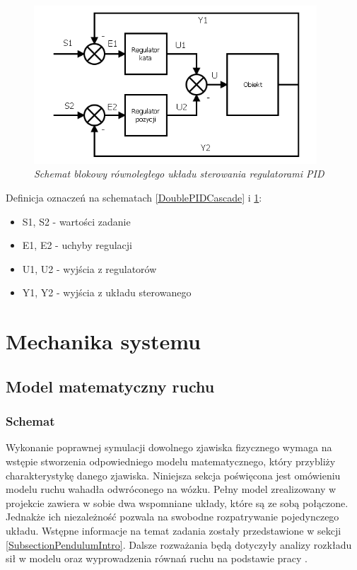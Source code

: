 \documentclass[12pt, oneside]{report}
\theoremstyle{definition}
\begin{document}
\begin{itemize}
\begin{figure}[H]
	\centering
		\includegraphics[width = 300pt]{DoublePIDParallel} 
		\caption{\textit{Schemat blokowy równoległego układu sterowania regulatorami PID\cite{JTJT}}}
		\label{DoublePIDParallel}
\end{figure}
\end{itemize}

Definicja oznaczeń na schematach \ref{DoublePIDCascade} i \ref{DoublePIDParallel}:
\begin{itemize}
\item S1, S2 - wartości zadanie
\item E1, E2 - uchyby regulacji
\item U1, U2 - wyjścia z regulatorów
\item Y1, Y2 - wyjścia z układu sterowanego
\end{itemize}  

\section{Mechanika systemu}
\subsection{Model matematyczny ruchu}
\label{MathModel}
\subsubsection{Schemat}
Wykonanie poprawnej symulacji dowolnego zjawiska fizycznego wymaga na wstępie stworzenia odpowiedniego modelu matematycznego, który przybliży charakterystykę danego zjawiska. Niniejsza sekcja poświęcona jest omówieniu modelu ruchu wahadła odwróconego na wózku. Pełny model zrealizowany w projekcie zawiera w sobie dwa wspomniane układy, które są ze sobą połączone. Jednakże ich niezależność pozwala na swobodne rozpatrywanie pojedynczego układu. Wstępne informacje na temat zadania zostały przedstawione w sekcji \ref{SubsectionPendulumIntro}. Dalsze rozważania będą dotyczyły analizy rozkładu sił w modelu oraz wyprowadzenia równań ruchu na podstawie pracy \cite{LMIP}.
\end{document}
